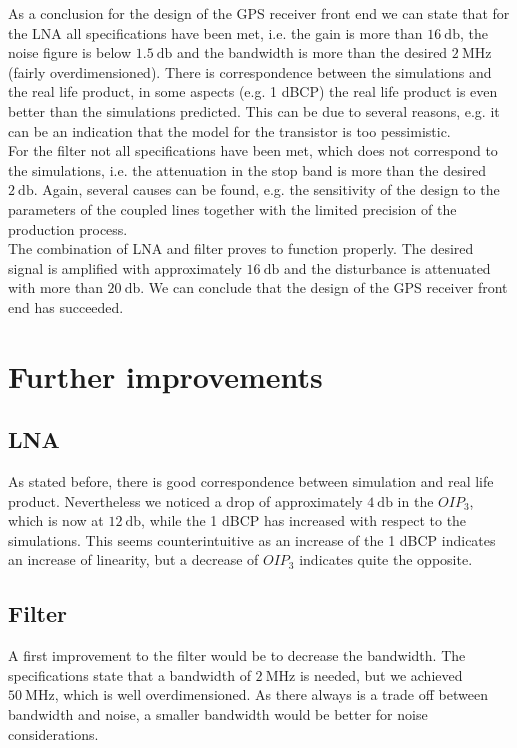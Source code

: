 \documentclass[a4paper]{article}        %
\begin{document}
	As a conclusion for the design of the GPS receiver front end we can state that for the LNA all specifications have been met, i.e. the gain is more than $\SI{16}{\decibel}$, the noise figure is below $\SI{1.5}{\decibel}$ and the bandwidth is more than the desired $\SI{2}{\mega\hertz}$ (fairly overdimensioned). There is correspondence between the simulations and the real life product, in some aspects (e.g. 1 dBCP) the real life product is even better than the simulations predicted. This can be due to several reasons, e.g. it can be an indication that the model for the transistor is too pessimistic. \\

	For the filter not all specifications have been met, which does not correspond to the simulations, i.e. the attenuation in the stop band is more than the desired $\SI{2}{\decibel}$. Again, several causes can be found, e.g. the sensitivity of the design to the parameters of the coupled lines together with the limited precision of the production process. \\

	The combination of LNA and filter proves to function properly. The desired signal is amplified with approximately $\SI{16}{\decibel}$ and the disturbance is attenuated with more than $\SI{20}{\decibel}$. We can conclude that the design of the GPS receiver front end has succeeded.  

\section{Further improvements}

	\subsection{LNA}
		As stated before, there is good correspondence between simulation and real life product. Nevertheless we noticed a drop of approximately $\SI{4}{\decibel}$ in the $OIP_3$, which is now at $\SI{12}{\decibel}$, while the 1 dBCP has increased with respect to the simulations. This seems counterintuitive as an increase of the 1 dBCP indicates an increase of linearity, but a decrease of $OIP_3$ indicates quite the opposite. 

	\subsection{Filter}
		A first improvement to the filter would be to decrease the bandwidth. The specifications state that a bandwidth of $\SI{2}{\mega\hertz}$ is needed, but we achieved $\SI{50}{\mega\hertz}$, which is well overdimensioned. As there always is a trade off between bandwidth and noise, a smaller bandwidth would be better for noise considerations. \\
\end{document}
